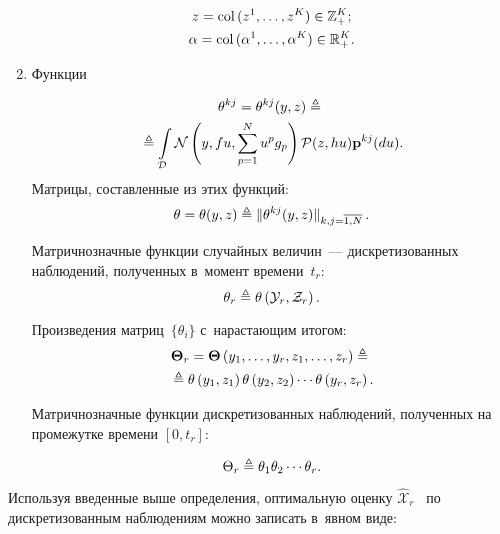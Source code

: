 \begin{multicols}{2}
\begin{enumerate}[1.]
 \vspace*{-6pt}
 
 \noindent
\begin{multline*}
z = \col\,(z^1,\ldots,z^K) \hm\in 
\mathbb{Z}_+^K;\\
\alpha \hm= \col\,(\alpha^1,\ldots,\alpha^K) \hm\in \mathbb{R}_+^K.
\end{multline*}
 
 \item Функции
 
  \vspace*{-5pt}
  
  \noindent
 \begin{multline*}
 \theta^{kj} = \theta^{kj}(y,z) \triangleq{}\\
 {}\triangleq \int\limits_{\mathcal{D}} 
\mathcal{N}\left(y,fu,\sum\limits_{p=1}^N u^p g_p\right)
\mathcal{P}(z,hu)\mathbf{p}^{k j}(du).
\end{multline*}
 Мат\-ри\-цы, со\-став\-лен\-ные из этих функций:
$$
\theta =\theta(y,z) \triangleq \|\theta^{kj}(y,z)\|_{k,j=\overline{1,N}}\,.
$$ 

Матричнозначные функции случайных величин~--- дискретизованных наблюдений, 
полученных в~момент времени~$t_r$:
$$
\theta_r \triangleq \theta\left(\mathcal{Y}_r,\mathcal{Z}_r\right).
$$

\vspace*{-12pt}

\columnbreak


\noindent
Произведения мат\-риц~$\{\theta_i\}$ с~на\-рас\-та\-ющим итогом:
\begin{multline*}
\mathbf{\Theta}_r = \mathbf{\Theta}\left(y_1,\ldots,y_r, z_1,\ldots,z_r\right) \triangleq{}\\
{}\triangleq
\theta\left(y_1,z_1\right)\theta\left(y_2,z_2\right)\cdots \theta\left(y_r,z_r\right).
\end{multline*}

Матричнозначные функции  дискретизованных наблюдений, полученных на 
промежутке времени $[0, t_r]$:


\noindent
$$
\Theta_r \triangleq \theta_1\theta_2 \cdots\theta_r.
$$
\end{enumerate}

Используя введенные выше определения, оптимальную оценку 
$\widehat{\mathcal{X}}_r$~\cite{B_21_2_IA} по дискретизованным наблюдениям можно 
записать в~явном виде:


\end{multicols}
